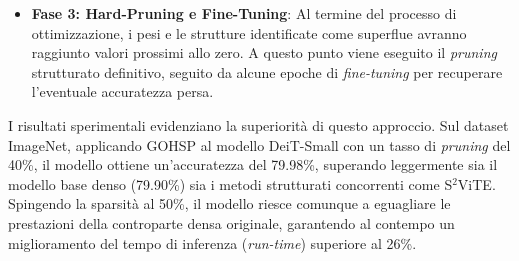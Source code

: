 \begin{itemize}
    \item \textbf{Fase 3: Hard-Pruning e Fine-Tuning}: Al termine del processo di ottimizzazione, i pesi e le strutture identificate come superflue avranno raggiunto valori prossimi allo zero. A questo punto viene eseguito il \textit{pruning} strutturato definitivo, seguito da alcune epoche di \textit{fine-tuning} per recuperare l'eventuale accuratezza persa.
\end{itemize}
I risultati sperimentali evidenziano la superiorità di questo approccio. Sul dataset ImageNet, applicando GOHSP al modello DeiT-Small con
un tasso di \textit{pruning} del 40\%, il modello ottiene un'accuratezza
del 79.98\%, superando leggermente sia il modello base denso (79.90\%) sia i
metodi strutturati concorrenti come S$^2$ViTE. Spingendo la sparsità al 50\%,
il modello riesce comunque a eguagliare le prestazioni della controparte densa
originale, garantendo al contempo un miglioramento del tempo di
inferenza (\textit{run-time}) superiore al 26\%.

